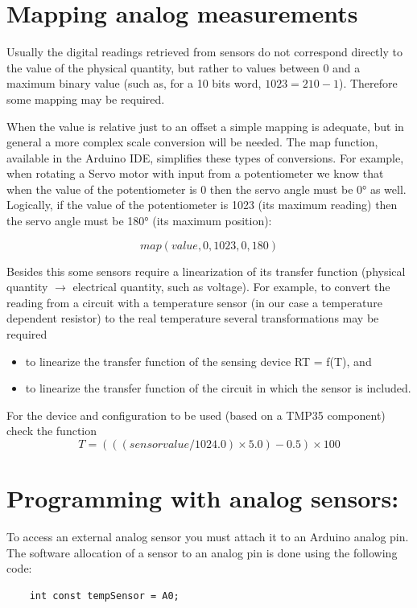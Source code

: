 \documentclass[10pt]{article}
\begin{document}
\section{Mapping analog measurements}

Usually the digital readings retrieved from sensors do not correspond directly
to the value of the physical quantity, but rather to values between 0 and a
maximum binary value (such as, for a 10 bits word, $1023 = 210 - 1$). Therefore
some mapping may be required.

When the value is relative just to an offset a simple mapping is adequate, but
in general a more complex scale conversion will be needed. The map function,
available in the Arduino IDE, simplifies these types of conversions. For
example, when rotating a Servo motor with input from a potentiometer we know
that when the value of the potentiometer is 0 then the servo angle must be 0° as
well. Logically, if the value of the potentiometer is 1023 (its maximum reading)
then the servo angle must be 180° (its maximum position):

\[map(value, 0, 1023, 0, 180)\]

Besides this some sensors require a linearization of its transfer function
(physical quantity $\rightarrow$ electrical quantity, such as voltage). For
example, to convert the reading from a circuit with a temperature sensor (in our
case a temperature dependent resistor) to the real temperature several
transformations may be required

\begin{itemize}
    \item to linearize the transfer function of the sensing device RT = f(T), and
    \item to linearize the transfer function of the circuit in which the sensor is included.
\end{itemize}

For the device and configuration to be used (based on a TMP35 component) check the function
\[T = (((sensor value / 1024.0) \times 5.0) - 0.5) \times  100\]

\section{Programming with analog sensors:}
To access an external analog sensor you must attach it to an Arduino analog pin. The software allocation of a sensor to an analog pin is done using the following code:

\begin{verbatim}
    int const tempSensor = A0;
\end{verbatim}
\end{document}
